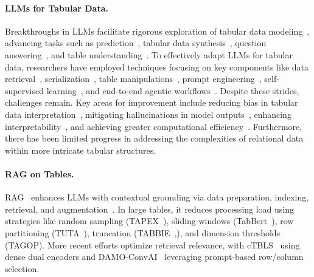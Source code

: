 \documentclass[11pt]{article}
\begin{document}
\paragraph{LLMs for Tabular Data.} Breakthroughs in LLMs facilitate rigorous exploration of tabular data modeling~\citep{fang2024large}, advancing tasks such as prediction~\citep{hegselmann2023tabllm,wang2023unipredict}, tabular data synthesis~\citep{gulati2024tabmt}, question answering~\citep{ye2023large}, and table understanding~\citep{sui2023tap4llm}.
To effectively adapt LLMs for tabular data, researchers have employed techniques focusing on key components like data retrieval~\citep{padhi2021tabular,wang2022transtab}, serialization~\citep{iida2021tabbie,sui2024table}, table manipulations~\citep{liu2023rethinking}, prompt engineering~\citep{chen2022large}, self-supervised learning~\citep{yang2023unitabe,iida2021tabbie}, and end-to-end agentic workflows~\citep{abraham2022tablequery}. 
Despite these strides, challenges remain. Key areas for improvement include reducing bias in tabular data interpretation~\citep{liu2023investigating}, mitigating hallucinations in model outputs~\citep{akhtar2023exploring}, enhancing interpretability~\citep{hegselmann2023tabllm}, and achieving greater computational efficiency~\citep{ruan2024language}.  Furthermore, there has been limited progress in addressing the complexities of relational data within more intricate tabular structures. 


\paragraph{RAG on Tables.} RAG~\citep{gao2023retrieval,chen2024benchmarking} enhances LLMs with contextual grounding via data preparation, indexing, retrieval, and augmentation~\citep{gupta2024comprehensive}. In large tables, it reduces processing load using strategies like random sampling (TAPEX~\citep{liu2021tapex}), sliding windows (TabBert~\citep{padhi2021tabular}), row partitioning (TUTA~\citep{wang2021tuta}), truncation (TABBIE~\citep{iida2021tabbie},\citep{qin2022external}), and dimension thresholds (TAGOP\citep{zhu2021tat}). More recent efforts optimize retrieval relevance, with cTBLS~\citep{sundar2023ctbls} using dense dual encoders and DAMO-ConvAI~\citep{ye2023large} leveraging prompt-based row/column selection.
\end{document}
